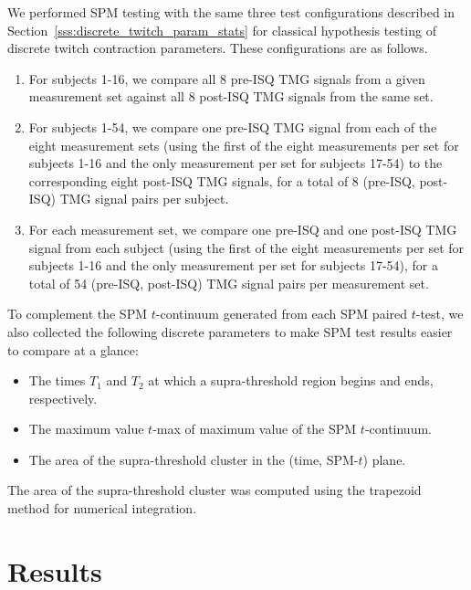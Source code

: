 \documentclass[utf8]{FrontiersinHarvard}
\begin{document}
We performed SPM testing with the same three test configurations described in Section~\ref{sss:discrete_twitch_param_stats} for classical hypothesis testing of discrete twitch contraction parameters.
These configurations are as follows.
\begin{enumerate}

    \item For subjects 1-16, we compare all 8 pre-ISQ TMG signals from a given measurement set against all 8 post-ISQ TMG signals from the same set.

    \item For subjects 1-54, we compare one pre-ISQ TMG signal from each of the eight measurement sets (using the first of the eight measurements per set for subjects 1-16 and the only measurement per set for subjects 17-54) to the corresponding eight post-ISQ TMG signals, for a total of 8 (pre-ISQ, post-ISQ) TMG signal pairs per subject.

    \item For each measurement set, we compare one pre-ISQ and one post-ISQ TMG signal from each subject (using the first of the eight measurements per set for subjects 1-16 and the only measurement per set for subjects 17-54), for a total of 54 (pre-ISQ, post-ISQ) TMG signal pairs per measurement set.

\end{enumerate}

To complement the SPM $ t $-continuum generated from each SPM paired $ t $-test, we also collected the following discrete parameters to make SPM test results easier to compare at a glance:
\begin{itemize}

    \item The times $ T_{1} $ and $ T_{2} $ at which a supra-threshold region begins and ends, respectively.
    \item The maximum value $ t $-max of maximum value of the SPM $ t $-continuum.
    \item The area of the supra-threshold cluster in the (time, SPM-$ t $) plane.

\end{itemize}
The area of the supra-threshold cluster was computed using the trapezoid method for numerical integration.

\section{Results} \label{s:results}
\end{document}
